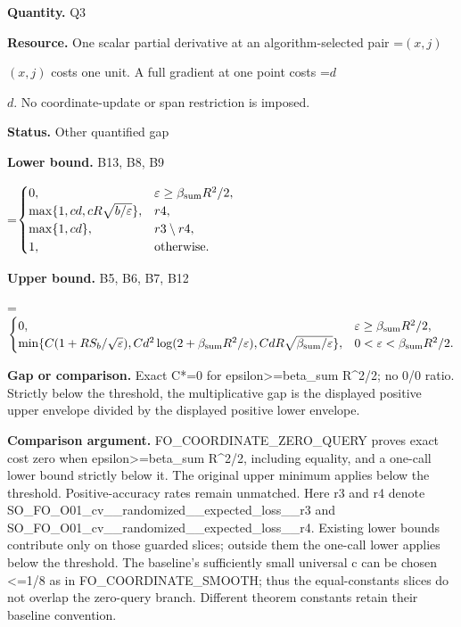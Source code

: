 \documentclass[10pt,a4paper]{article}
\newcommand{\AtlasMath}[1]{\par\begingroup\centering\setbox0=\hbox{$\displaystyle #1$}\ifdim\wd0>1.4\linewidth\typeout{ATLAS WIDE FORMULA: \the\wd0}\fi\ifdim\wd0>\linewidth\resizebox{\linewidth}{!}{\box0}\else\box0\fi\par\endgroup}
\newcommand{\AtlasInlineMath}[1]{\begingroup\setbox0=\hbox{$#1$}\ifdim\wd0>.4\linewidth\endgroup\AtlasMath{#1}\else\endgroup$#1$\fi}
\begin{document}
\textbf{Quantity.} Q3

\textbf{Resource.} One scalar partial derivative at an algorithm-selected pair \AtlasInlineMath{(x,j)} costs one unit. A full gradient at one point costs \AtlasInlineMath{d}. No coordinate-update or span restriction is imposed.

\textbf{Status.} Other quantified gap

\textbf{Lower bound.} B13, B8, B9

\AtlasMath{\begin{cases}0,&\varepsilon\ge\beta_{\rm sum}R^2/2,\\\max\{1,cd,cR\sqrt{b/\varepsilon}\},&r4,\\\max\{1,cd\},&r3\setminus r4,\\1,&\text{otherwise}.\end{cases}}
\textbf{Upper bound.} B5, B6, B7, B12

\AtlasMath{\begin{cases}0,&\varepsilon\ge\beta_{\rm sum}R^2/2,\\\min\{C(1+RS_b/\sqrt\varepsilon),Cd^2\log(2+\beta_{\rm sum}R^2/\varepsilon),CdR\sqrt{\beta_{\rm sum}/\varepsilon}\},&0<\varepsilon<\beta_{\rm sum}R^2/2.\end{cases}}
\textbf{Gap or comparison.} Exact C*=0 for epsilon>=beta\_\allowbreak{}sum R\textasciicircum{}2/2; no 0/0 ratio. Strictly below the threshold, the multiplicative gap is the displayed positive upper envelope divided by the displayed positive lower envelope.

\textbf{Comparison argument.} FO\_\allowbreak{}COORDINATE\_\allowbreak{}ZERO\_\allowbreak{}QUERY proves exact cost zero when epsilon>=beta\_\allowbreak{}sum R\textasciicircum{}2/2, including equality, and a one-call lower bound strictly below it. The original upper minimum applies below the threshold. Positive-accuracy rates remain unmatched. Here r3 and r4 denote SO\_\allowbreak{}FO\_\allowbreak{}O01\_\allowbreak{}cv\_\allowbreak{}\_\allowbreak{}randomized\_\allowbreak{}\_\allowbreak{}expected\_\allowbreak{}loss\_\allowbreak{}\_\allowbreak{}r3 and SO\_\allowbreak{}FO\_\allowbreak{}O01\_\allowbreak{}cv\_\allowbreak{}\_\allowbreak{}randomized\_\allowbreak{}\_\allowbreak{}expected\_\allowbreak{}loss\_\allowbreak{}\_\allowbreak{}r4. Existing lower bounds contribute only on those guarded slices; outside them the one-call lower applies below the threshold. The baseline's sufficiently small universal c can be chosen <=1/8 as in FO\_\allowbreak{}COORDINATE\_\allowbreak{}SMOOTH; thus the equal-constants slices do not overlap the zero-query branch. Different theorem constants retain their baseline convention.
\end{document}
